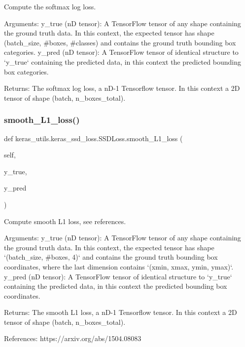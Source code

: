 \begin{DoxyVerb}Compute the softmax log loss.

Arguments:
    y_true (nD tensor): A TensorFlow tensor of any shape containing the ground truth data.
In this context, the expected tensor has shape (batch_size, #boxes, #classes)
and contains the ground truth bounding box categories.
    y_pred (nD tensor): A TensorFlow tensor of identical structure to `y_true` containing
the predicted data, in this context the predicted bounding box categories.

Returns:
    The softmax log loss, a nD-1 Tensorflow tensor. In this context a 2D tensor
    of shape (batch, n_boxes_total).
\end{DoxyVerb}
 \mbox{\label{classkeras__utils_1_1keras__ssd__loss_1_1_s_s_d_loss_af8b9efac79d769cb5d55728946798bd3}} 
\subsubsection{\texorpdfstring{smooth\+\_\+\+L1\+\_\+loss()}{smooth\_L1\_loss()}}
{\footnotesize\ttfamily def keras\+\_\+utils.\+keras\+\_\+ssd\+\_\+loss.\+S\+S\+D\+Loss.\+smooth\+\_\+\+L1\+\_\+loss (\begin{DoxyParamCaption}\item[{}]{self,  }\item[{}]{y\+\_\+true,  }\item[{}]{y\+\_\+pred }\end{DoxyParamCaption})}

\begin{DoxyVerb}Compute smooth L1 loss, see references.

Arguments:
    y_true (nD tensor): A TensorFlow tensor of any shape containing the ground truth data.
In this context, the expected tensor has shape `(batch_size, #boxes, 4)` and
contains the ground truth bounding box coordinates, where the last dimension
contains `(xmin, xmax, ymin, ymax)`.
    y_pred (nD tensor): A TensorFlow tensor of identical structure to `y_true` containing
the predicted data, in this context the predicted bounding box coordinates.

Returns:
    The smooth L1 loss, a nD-1 Tensorflow tensor. In this context a 2D tensor
    of shape (batch, n_boxes_total).

References:
    https://arxiv.org/abs/1504.08083
\end{DoxyVerb}
 

